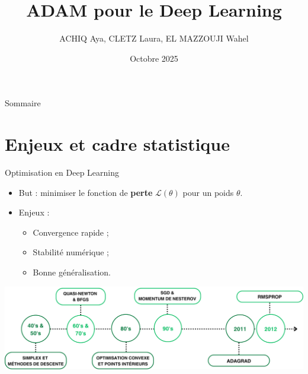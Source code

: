 \documentclass{beamer}
\title{ADAM pour le Deep Learning}
\author{ACHIQ Aya, CLETZ Laura, EL MAZZOUJI Wahel}
\date{\footnotesize Octobre 2025}
\begin{document}
\begin{frame}

  \titlepage

\end{frame}

\begin{frame}{Sommaire}

  \tableofcontents

\end{frame}

\section{Enjeux et cadre statistique}

\begin{frame}{Optimisation en Deep Learning}

  \begin{itemize}
    \item But : minimiser le fonction de \textbf{perte} $\mathcal{L}(\theta)$ pour un poids $\theta$.
    \medskip
    \item Enjeux : 
    \begin{itemize}
      \item Convergence rapide ;
      \item Stabilité numérique ;
      \item Bonne généralisation.
    \end{itemize}
  \end{itemize}
  
  \begin{center}
    \includegraphics[width=\textwidth]{frise1.png}
  \end{center}

\end{frame}
\end{document}
